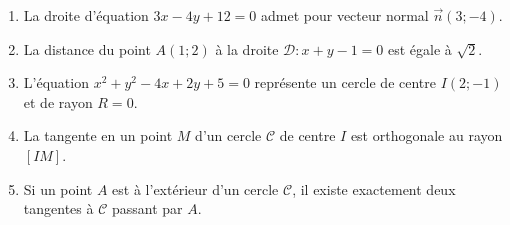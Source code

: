 \documentclass[11pt]{article}
\begin{document}
\begin{exercice}
\begin{enumerate}
    \item La droite d'équation $3x-4y+12=0$ admet pour vecteur normal $\vec{n}(3;-4)$.
    \item La distance du point $A(1;2)$ à la droite $\mathcal{D}: x+y-1=0$ est égale à $\sqrt{2}$.
    \item L'équation $x^2+y^2-4x+2y+5=0$ représente un cercle de centre $I(2;-1)$ et de rayon $R=0$.
    \item La tangente en un point $M$ d'un cercle $\mathcal{C}$ de centre $I$ est orthogonale au rayon $[IM]$.
    \item Si un point $A$ est à l'extérieur d'un cercle $\mathcal{C}$, il existe exactement deux tangentes à $\mathcal{C}$ passant par $A$.
\end{enumerate}
\end{exercice}
\end{document}

